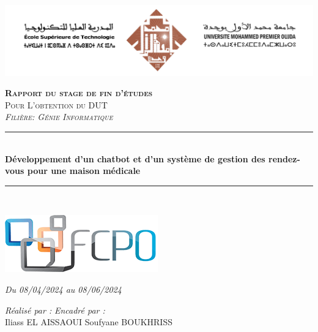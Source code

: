 
\thispagestyle{empty}
\hspace{0.4cm}  
\includegraphics[scale=0.40]{Logos/test.png} 
        
\vspace{-0.2cm}
\begin{center}
{\large \textsc{\textbf{Rapport du stage de fin d'études}}}\\[0.1cm]
{\large \textsc{Pour L'obtention du DUT}}\\[0.1cm]
{\large \textsc{\textit{Filière: Génie Informatique}}} \\[0.05cm] 
\vspace{-0.04cm}
\rule{\linewidth}{0.3mm} \\[0.4cm]   %
 { \huge \textbf{ Développement d'un chatbot et d'un système de gestion des rendez-vous pour une maison médicale }} \\[0.15cm] 
\rule{\linewidth}{0.3mm} \\[0.4cm]
\vspace{0.4cm}

\includegraphics[scale=0.475]{Logos/fcpo.png}  %

\vspace{0.3cm}

{\large \textit{Du 08/04/2024 au 08/06/2024 }}\\[0.5cm]

\vspace{1cm}

\noindent
\begin{minipage}{0.9\textwidth}
    \vspace{-7mm}
  \begin{flushleft} \large
    \emph{Réalisé par :} \hspace{8.1cm} \emph{Encadré par :} \\
    Iliass \textsc{EL AISSAOUI} \hspace{6.2cm} Soufyane \textsc{BOUKHRISS} %
  \end{flushleft}
\end{minipage}
\begin{minipage}{0.4\textwidth}


\end{minipage}
\end{center}
